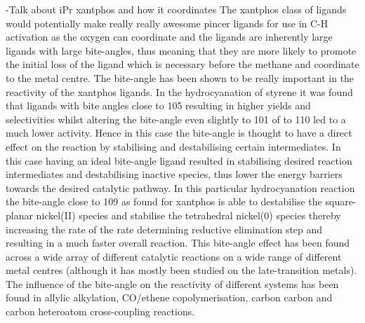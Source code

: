 -Talk about iPr xantphos and how it coordinates
The xantphos class of ligands would potentially make really really awesome pincer ligands for use in C-H activation as the oxygen can coordinate and the ligands are inherently large ligands with large bite-angles, thus meaning that they are more likely to promote the initial loss of the ligand which is necessary before the methane and coordinate to the metal centre.  The bite-angle has been shown to be really important in the reactivity of the xantphos ligands.  In the hydrocyanation of styrene it was found that ligands with bite angles close to 105\degrees{} resulting in higher yields and selectivities whilst altering the bite-angle even slightly to 101\degrees{} of to 110\degrees{} led to a much lower activity.  Hence in this case the bite-angle is thought to have a direct effect on the reaction by stabilising and destabilising certain intermediates.  In this case having an ideal bite-angle ligand resulted in stabilising desired reaction intermediates and destabilising inactive species, thus lower the energy barriers towards the desired catalytic pathway.  In this particular hydrocyanation reaction the bite-angle close to 109\degrees{} as found for xantphos is able to destabilise the square-planar nickel(II) species and stabilise the tetrahedral nickel(0) species thereby increasing the rate of the rate determining reductive elimination step and resulting in a much faster overall reaction.  This bite-angle effect has been found across a wide array of different catalytic reactions on a wide range of different metal centres (although it has mostly been studied on the late-transition metals).  The influence of the bite-angle on the reactivity of different systems has been found in allylic alkylation, CO/ethene copolymerisation, carbon carbon and carbon heteroatom cross-coupling reactions.  

